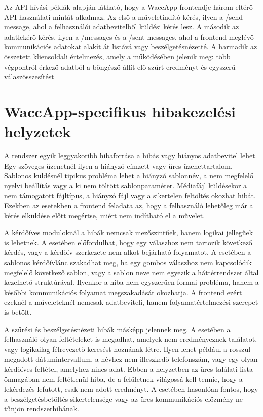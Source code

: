 Az API-hívási példák alapján látható, hogy a WaccApp frontendje három eltérő API-használati mintát alkalmaz. Az első a műveletindító kérés, ilyen a /send-message, ahol a felhasználói adatbevitelből küldési kérés lesz. A második az adatlekérő kérés, ilyen a /messages és a /sent-messages, ahol a frontend meglévő kommunikációs adatokat alakít át listává vagy beszélgetésnézetté. A harmadik az összetett kliensoldali értelmezés, amely a  működésében jelenik meg: több végpontról érkező adatból a böngésző állít elő szűrt eredményt és egyszerű válaszösszesítést

\section{WaccApp-specifikus hibakezelési helyzetek}

A rendszer egyik leggyakoribb hibaforrása a hibás vagy hiányos adatbevitel lehet. Egy szöveges üzenetnél ilyen a hiányzó címzett vagy üres üzenettartalom. Sablonos küldésnél tipikus probléma lehet a hiányzó sablonnév, a nem megfelelő nyelvi beállítás vagy a ki nem töltött sablonparaméter. Médiafájl küldésekor a nem támogatott fájltípus, a hiányzó fájl vagy a sikertelen feltöltés okozhat hibát. Ezekben az esetekben a frontend feladata az, hogy a felhasználó lehetőleg már a kérés elküldése előtt megértse, miért nem indítható el a művelet. 

A kérdőíves moduloknál a hibák nemcsak mezőszintűek, hanem logikai jellegűek is lehetnek. A  esetében előfordulhat, hogy egy válaszhoz nem tartozik következő kérdés, vagy a kérdőív szerkezete nem alkot bejárható folyamatot. A  esetében a sablonos kérdőívlánc szakadhat meg, ha egy gombos válaszhoz nem kapcsolódik megfelelő következő sablon, vagy a sablon neve nem egyezik a háttérrendszer által kezelhető struktúrával. Ilyenkor a hiba nem egyszerűen formai probléma, hanem a későbbi kommunikációs folyamat megszakadását okozhatja. A frontend ezért ezeknél a műveleteknél nemcsak adatbeviteli, hanem folyamatértelmezési szerepet is betölt. 

A szűrési és beszélgetésnézeti hibák másképp jelennek meg. A  esetében a felhasználó olyan feltételeket is megadhat, amelyek nem eredményeznek találatot, vagy logikailag félrevezető keresést hoznának létre. Ilyen lehet például a rosszul megadott dátumintervallum, a névhez nem illeszkedő telefonszám, vagy egy olyan kérdőíves feltétel, amelyhez nincs adat. Ebben a helyzetben az üres találati lista önmagában nem feltétlenül hiba, de a felületnek világossá kell tennie, hogy a lekérdezés lefutott, csak nem adott eredményt. A  esetében hasonlóan fontos, hogy a beszélgetésbetöltés sikertelensége vagy az üres kommunikációs előzmény ne tűnjön rendszerhibának. 

